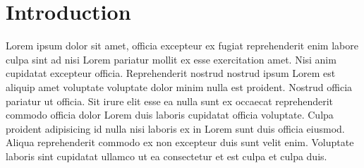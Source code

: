 \chapter{Introduction}
\label{ch:introduction}


Lorem ipsum dolor sit amet, officia excepteur ex fugiat reprehenderit enim
labore culpa sint ad nisi Lorem pariatur mollit ex esse exercitation amet. Nisi
anim cupidatat excepteur officia. Reprehenderit nostrud nostrud ipsum Lorem est
aliquip amet voluptate voluptate dolor minim nulla est proident. Nostrud
officia pariatur ut officia. Sit irure elit esse ea nulla sunt ex occaecat
reprehenderit commodo officia dolor Lorem duis laboris cupidatat officia
voluptate. Culpa proident adipisicing id nulla nisi laboris ex in Lorem sunt
duis officia eiusmod. Aliqua reprehenderit commodo ex non excepteur duis sunt
velit enim. Voluptate laboris sint cupidatat ullamco ut ea consectetur et est
culpa et culpa duis.
